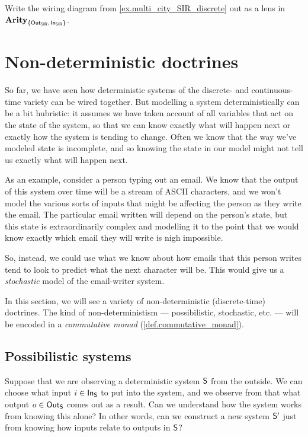 \documentclass[DynamicalBook]{subfiles}
\begin{document}
\begin{exercise}

  
  Write the wiring diagram from \cref{ex.multi_city_SIR_discrete} out as a lens
  in $\textbf{Arity}_{\{\mathsf{Out}_{\mathsf{SIR}},\, \mathsf{In}_{\mathsf{SIR}} \}}$.
\end{exercise}

\section{Non-deterministic doctrines}

So far, we have seen how deterministic systems of the discrete- and
continuous-time variety can be wired together. But modelling a system
deterministically can be a bit hubristic: it assumes we have taken account of
all variables that act on the state of the system, so that we can know exactly
what will happen next or exactly how the system is tending to change. Often we
know that the way we've modeled state is incomplete, and so knowing the state in
our model might not tell us exactly what will happen next.

As an example, consider a person typing out an email. We know that the output of
this system over time will be a stream of ASCII characters, and we won't model the various sorts
of inputs that might be affecting the person as they write the email. The
particular email written will depend on the person's state, but this state is
extraordinarily complex and modelling it to the point that we would know exactly
which email they will write is nigh impossible. 

So, instead, we could use what
we know about how emails that this person writes tend to look to predict what
the next character will be. This would give us a \emph{stochastic} model of the
email-writer system.

In this section, we will see a variety of non-deterministic (discrete-time)
doctrines. The kind of non-deterministism --- possibilistic, stochastic, etc.
--- will be encoded in a \emph{commutative monad}
(\cref{def.commutative_monad}). 

\subsection{Possibilistic  systems}

Suppose that we are observing a deterministic system $\mathsf{S}$ from the outside.
We can choose what input $i \in \mathsf{In}_{\mathsf{S}}$ to put into the system, and we observe
from that what output $o \in \mathsf{Out}_{\mathsf{S}}$ comes out as a result. Can we understand
how the system works from knowing this alone? In other words, can we construct a
new system $\mathsf{S'}$ just from knowing how inputs relate to outputs in $\mathsf{S}$?
\end{document}
